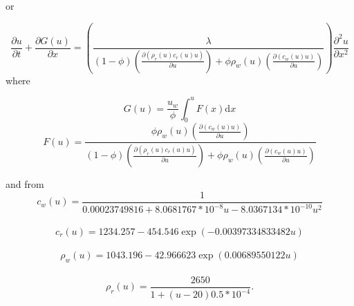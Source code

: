 or 

\begin{equation}\label{eq:cl1}
\frac{\partial u}{\partial t} +\frac{ \partial G(u) }{\partial x}=\left(\frac{\lambda}{  (1-\phi)\left( \frac{ \partial (\rho_{r}(u)  c_{r}(u) u) }{\partial u}\right) +  \phi \rho_{w}(u)\left(  \frac{\partial (c_{w}(u)u)  }{\partial u  } \right)     } \right)\frac{\partial^{2}u}{\partial x^{2}}							       
\end{equation}
where 

\begin{equation}\label{eq:G0}
G(u) = \frac{u_{w}}{\phi}\int_{0}^{u}F(x)\mathrm{d}x \nonumber
\end{equation}
\begin{equation}\label{eq:F}
F(u)=\frac{  \phi \rho_{w}(u)\left(  \frac{\partial (c_{w}(u) u)  }{\partial u  }   \right)    }{  (1-\phi)\left( \frac{ \partial (\rho_{r}(u)  c_{r}(u) u) }{\partial u}\right) +  \phi \rho_{w}(u)\left(  \frac{\partial (c_{w}(u)u)  }{\partial u  } \right)     }
\end{equation}
 
 and from \cite{Waj05}
\begin{equation}
c_{w}(u)=\frac{1}{0.00023749816+8.0681767*10^{-8}u-8.0367134*10^{-10}u^{2}}\nonumber
\end{equation}
\\
\begin{equation}
c_{r}(u)=1234.257-454.546\exp(-0.00397334833482u)\nonumber
\end{equation}
\\
\begin{equation}
\rho_{w}(u)=1043.196-42.966623\exp(0.00689550122u)\nonumber
\end{equation}
\\
\begin{equation}
\rho_{r}(u)=\frac{2650}{1+(u-20)0.5*10^{-4}}.\nonumber
\end{equation}
\\

